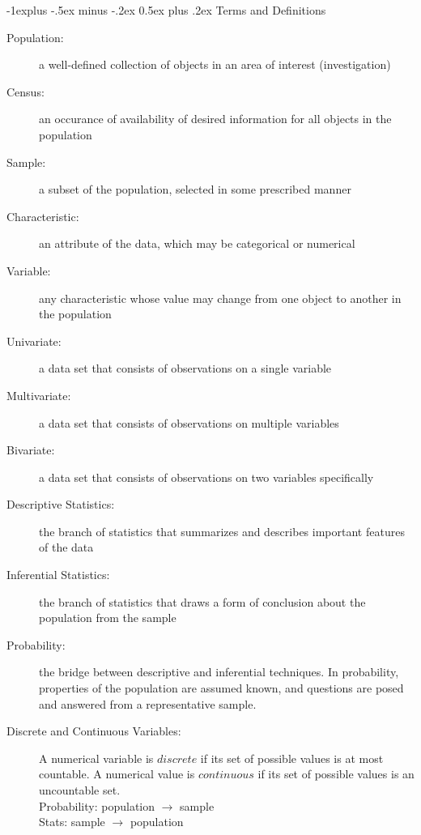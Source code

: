 \documentclass[10pt,landscape]{article}
\makeatletter
\renewcommand{\subsection}{\@startsection{subsection}{2}{0mm}%
                                {-1explus -.5ex minus -.2ex}%
                                {0.5ex plus .2ex}%
                                {\normalfont\normalsize\bfseries}}
\makeatother
\begin{document}
\begin{multicols}{3}
	\subsection{Terms and Definitions}
\begin{description}
\item[Population:] a well-defined collection of objects in an area of interest (investigation)
\item[Census:] an occurance of availability of desired information for all objects in the population
\item[Sample:] a subset of the population, selected in some prescribed manner
\item[Characteristic:] an attribute of the data, which may be categorical or numerical
\item[Variable:] any characteristic whose value may change from one object to another in the population
\item[Univariate:] a data set that consists of observations on a single variable
\item[Multivariate:] a data set that consists of observations on multiple variables
\item[Bivariate:] a data set that consists of observations on two variables specifically
\item[Descriptive Statistics:] the branch of statistics that summarizes and describes important features of the data
\item[Inferential Statistics:] the branch of statistics that draws a form of conclusion about the population from the sample
\item[Probability:] the bridge between descriptive and inferential techniques. In probability, properties of the population are assumed known, and questions are posed and answered from a representative sample.
\item[Discrete and Continuous Variables:] A numerical variable is $discrete$ if its set of possible values is at most countable. A numerical value is $continuous$ if its set of possible values is an uncountable set.\\

Probability: population $\to$ sample\\
Stats: sample $\to$ population\\
\end{description}

\end{multicols}
\end{document}
